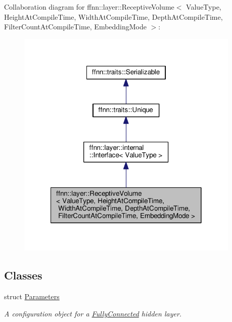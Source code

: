 Collaboration diagram for ffnn\-:\-:layer\-:\-:Receptive\-Volume$<$ Value\-Type, Height\-At\-Compile\-Time, Width\-At\-Compile\-Time, Depth\-At\-Compile\-Time, Filter\-Count\-At\-Compile\-Time, Embedding\-Mode $>$\-:\nopagebreak
\begin{figure}[H]
\begin{center}
\leavevmode
\includegraphics[width=302pt]{classffnn_1_1layer_1_1_receptive_volume__coll__graph}
\end{center}
\end{figure}
\subsection*{Classes}
\begin{DoxyCompactItemize}
\item 
struct \hyperlink{structffnn_1_1layer_1_1_receptive_volume_1_1_parameters}{Parameters}
\begin{DoxyCompactList}\small\item\em A configuration object for a \hyperlink{classffnn_1_1layer_1_1_fully_connected}{Fully\-Connected} hidden layer. \end{DoxyCompactList}\end{DoxyCompactItemize}
